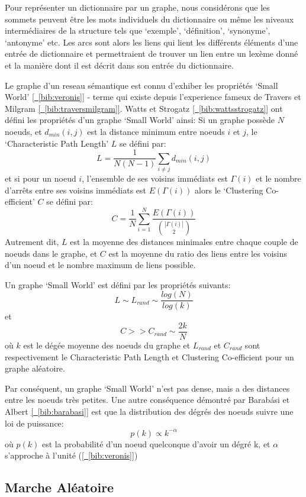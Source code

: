 Pour représenter un dictionnaire par un graphe, nous considérons que les 
sommets peuvent être les mots individuels du dictionnaire ou même les niveaux 
intermédiaires de la structure tels que `exemple', `définition', `synonyme', 
`antonyme' etc. Les arcs sont alors les liens qui lient les différents éléments 
d'une entrée de dictionnaire et permettraient de trouver un lien entre un 
lexème donné et la manière dont il est décrit dans son entrée du dictionnaire.

Le graphe d'un reseau sémantique est connu d'exhiber les propriétés `Small World'
\hyperref[bib:veronis]{[~\ref*{bib:veronis}]} -
terme qui existe depuis l'experience fameux de Travers et Milgram
\hyperref[bib:traversmilgram]{[~\ref*{bib:traversmilgram}]}.
Watts et Strogatz \hyperref[bib:wattsstrogatz]{[~\ref*{bib:wattsstrogatz}]}
ont défini les propriétés d'un graphe `Small World' ainsi:
Si un graphe possède $N$ noeuds, et $d_{min}(i,j)$ est la distance minimum
entre noeuds $i$ et $j$, le `Characteristic Path Length' $L$ se défini par:
$$L = \frac{1}{N(N-1)} \sum\limits_{i\ne j} d_{min}(i,j) $$
et si pour un noeud $i$, l'ensemble de ses voisins immédiats est $\Gamma (i)$
et le nombre d'arrêts entre ses voisins immédiats est $E(\Gamma (i))$
alors le `Clustering Co-efficient' $C$ se défini par:
$$C = \frac{1}{N}\sum\limits_{i=1}^N \frac{E(\Gamma (i))}{\binom{|\Gamma (i)|}{2}} $$
Autrement dit, $L$ est la moyenne des distances minimales entre chaque couple
de noeuds dans le graphe, et $C$ est la moyenne du ratio des liens entre les voisins d'un
noeud et le nombre maximum de liens possible.

Un graphe `Small World' est défini par les propriétés suivants:
$$L \sim L_{rand} \sim \frac{log(N)}{log(k)} $$
et
$$C >> C_{rand} \sim \frac{2k}{N} $$
où $k$ est le dégée moyenne des noeuds du graphe et $L_{rand}$ et $C_{rand}$ sont respectivement
le Characteristic Path Length et Clustering Co-efficient pour un graphe aléatoire.

Par conséquent, un graphe `Small World' n'est pas dense, mais a des distances entre les noeuds
très petites. Une autre conséquence démontré par Barabási et Albert
\hyperref[bib:barabasi]{[~\ref*{bib:barabasi}]} est que la distribution des dégrés
des noeuds suivre une loi de puissance:
$$ p(k) \propto k^{-\alpha}$$
où $p(k)$ est la probabilité d'un noeud quelconque d'avoir un dégré k, et
$\alpha$ s'approche à l'unité (\hyperref[bib:veronis]{[~\ref*{bib:veronis}]})


\subsection{ Marche Aléatoire }



